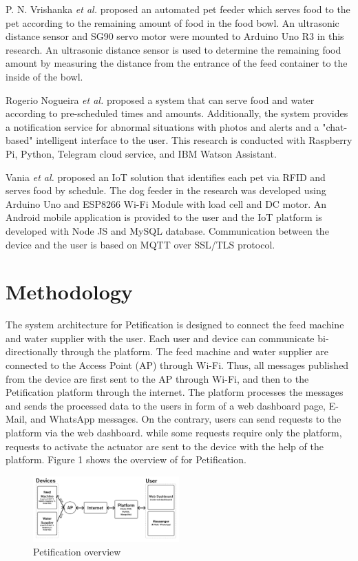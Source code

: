 ﻿\documentclass[conference]{IEEEtran}
\begin{document}
P. N. Vrishanka \textit{et al.} \cite{b9} proposed an automated pet feeder which serves food to the pet according to the remaining amount of food in the food bowl.
An ultrasonic distance sensor and SG90 servo motor were mounted to Arduino Uno R3 in this research.
An ultrasonic distance sensor is used to determine the remaining food amount by measuring the distance from the entrance of the feed container to the inside of the bowl.

Rogerio Nogueira \textit{et al.} \cite{b10} proposed a system that can serve food and water according to pre-scheduled times and amounts.
Additionally, the system provides a notification service for abnormal situations with photos and alerts and a "chat-based" intelligent interface to the user.
This research is conducted with Raspberry Pi, Python, Telegram cloud service, and IBM Watson Assistant.

Vania \textit{et al.} \cite{b11} proposed an IoT solution that identifies each pet via RFID and serves food by schedule.
The dog feeder in the research was developed using Arduino Uno and ESP8266 Wi-Fi Module with load cell and DC motor.
An Android mobile application is provided to the user and the IoT platform is developed with Node JS and MySQL database.
Communication between the device and the user is based on MQTT over SSL/TLS protocol.

\section{Methodology}
The system architecture for Petification is designed to connect the feed machine and water supplier with the user.
Each user and device can communicate bi-directionally through the platform.
The feed machine and water supplier are connected to the Access Point (AP) through Wi-Fi.
Thus, all messages published from the device are first sent to the AP through Wi-Fi, and then to the Petification platform through the internet.
The platform processes the messages and sends the processed data to the users in form of a web dashboard page, E-Mail, and WhatsApp messages.
On the contrary, users can send requests to the platform via the web dashboard.
while some requests require only the platform, requests to activate the actuator are sent to the device with the help of the platform.
Figure 1 shows the overview of for Petification.


\begin{figure}[htbp]
\centerline{\includegraphics[width=0.5\textwidth]{./images/Overview.png}}
\caption{Petification overview}
\label{fig}
\end{figure}
\end{document}
